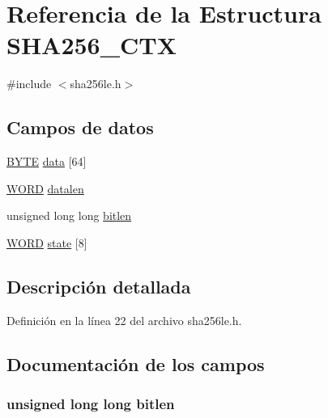 \hypertarget{struct_s_h_a256___c_t_x}{}\section{Referencia de la Estructura S\+H\+A256\+\_\+\+C\+T\+X}
\label{struct_s_h_a256___c_t_x}


{\ttfamily \#include $<$sha256le.\+h$>$}

\subsection*{Campos de datos}
\begin{DoxyCompactItemize}
\item 
\hyperlink{sha256le_8h_a4ae1dab0fb4b072a66584546209e7d58}{B\+Y\+T\+E} \hyperlink{struct_s_h_a256___c_t_x_a8a17db6f40bbecb79cbb64aaeeaeba5e}{data} \mbox{[}64\mbox{]}
\item 
\hyperlink{sha256le_8h_ad2baa11c897721ff6f14b452b547f9bc}{W\+O\+R\+D} \hyperlink{struct_s_h_a256___c_t_x_ab94b143853886bff721a273cc7242171}{datalen}
\item 
unsigned long long \hyperlink{struct_s_h_a256___c_t_x_a9ef8c3daffe76c802a308b323158fc79}{bitlen}
\item 
\hyperlink{sha256le_8h_ad2baa11c897721ff6f14b452b547f9bc}{W\+O\+R\+D} \hyperlink{struct_s_h_a256___c_t_x_a6cde2322d13788f1d9740d1cae5d58a0}{state} \mbox{[}8\mbox{]}
\end{DoxyCompactItemize}


\subsection{Descripción detallada}


Definición en la línea 22 del archivo sha256le.\+h.



\subsection{Documentación de los campos}
\hypertarget{struct_s_h_a256___c_t_x_a9ef8c3daffe76c802a308b323158fc79}{}
\subsubsection[{bitlen}]{\setlength{\rightskip}{0pt plus 5cm}unsigned long long bitlen}\label{struct_s_h_a256___c_t_x_a9ef8c3daffe76c802a308b323158fc79}


